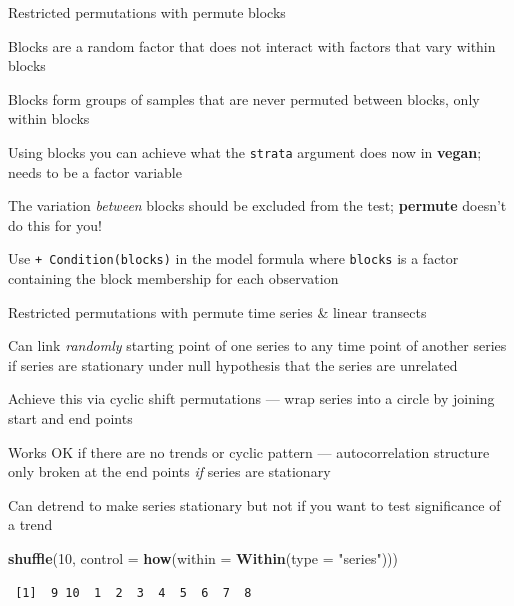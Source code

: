\documentclass[10pt,ignorenonframetext,compress, aspectratio=169]{beamer}
\newenvironment{Shaded}{\begin{snugshade}}{\end{snugshade}}
\newcommand{\KeywordTok}[1]{\textcolor[rgb]{0.13,0.29,0.53}{\textbf{{#1}}}}
\newcommand{\DataTypeTok}[1]{\textcolor[rgb]{0.13,0.29,0.53}{{#1}}}
\newcommand{\DecValTok}[1]{\textcolor[rgb]{0.00,0.00,0.81}{{#1}}}
\newcommand{\StringTok}[1]{\textcolor[rgb]{0.31,0.60,0.02}{{#1}}}
\newcommand{\NormalTok}[1]{{#1}}
\begin{document}
\begin{frame}{Restricted permutations with permute \textbar{} blocks}

Blocks are a random factor that does not interact with factors that vary
within blocks

Blocks form groups of samples that are never permuted between blocks,
only within blocks

Using blocks you can achieve what the \texttt{strata} argument does now
in \textbf{vegan}; needs to be a factor variable

The variation \emph{between} blocks should be excluded from the test;
\textbf{permute} doesn't do this for you!

Use \texttt{+ Condition(blocks)} in the model formula where
\texttt{blocks} is a factor containing the block membership for each
observation

\end{frame}

\begin{frame}[fragile]{Restricted permutations with permute \textbar{}
time series \& linear transects}

Can link \emph{randomly} starting point of one series to any time point
of another series if series are stationary under null hypothesis that
the series are unrelated

Achieve this via cyclic shift permutations --- wrap series into a circle
by joining start and end points

Works OK if there are no trends or cyclic pattern --- autocorrelation
structure only broken at the end points \emph{if} series are stationary

Can detrend to make series stationary but not if you want to test
significance of a trend

\scriptsize

\begin{Shaded}
\begin{Highlighting}[]
\KeywordTok{shuffle}\NormalTok{(}\DecValTok{10}\NormalTok{, }\DataTypeTok{control =} \KeywordTok{how}\NormalTok{(}\DataTypeTok{within =} \KeywordTok{Within}\NormalTok{(}\DataTypeTok{type =} \StringTok{"series"}\NormalTok{)))}
\end{Highlighting}
\end{Shaded}

\begin{verbatim}
 [1]  9 10  1  2  3  4  5  6  7  8
\end{verbatim}

\normalsize

\end{frame}
\end{document}
